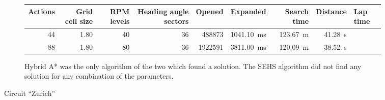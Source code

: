 \begin{figure}[!tbp]
	\vspace{0.75cm}
	
	\begin{subfigure}[t]{\textwidth}
		\centering
		\begin{tabular}{r r r r r r r r}%
            \toprule
                Actions & Grid cell size & RPM levels & Heading angle sectors & Opened & Expanded & Search time & Distance & Lap time \\
			\midrule
                \num{44} & \num{1.80} & \num{40} & \num{36} & \num{488873} & \SI{1041.10}{\milli\second} & \SI{123.67}{\meter} & \SI{41.28}{\second} \\
                \num{88} & \num{1.80} & \num{80} & \num{36} & \num{1922591} & \SI{3811.00}{\milli\second} & \SI{120.09}{\meter} & \SI{38.52}{\second} \\
			\bottomrule
		\end{tabular}
		\caption{Hybrid A* was the only algorithm of the two which found a solution. The SEHS algorithm did not find any solution for any combination of the parameters.}
		\label{table:zurich-hybrid_astar}
    \end{subfigure}
	
	\vspace{0.75cm}

	\caption{Circuit ``Zurich''}
	\label{fig:zurich}
\end{figure}